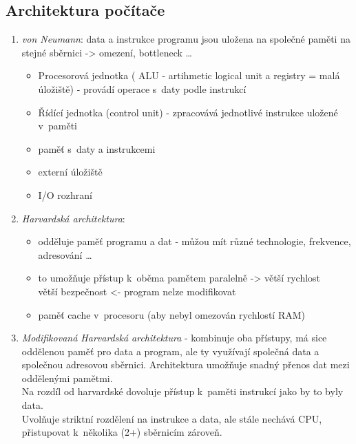 \documentclass[12pt]{article}
\begin{document}
\subsection{Architektura počítače}
\begin{enumerate}
\item \emph{von Neumann}: data a instrukce programu jsou uložena na společné paměti na stejné sběrnici -> omezení, bottleneck \dots
\begin{itemize}
\item Procesorová jednotka ( ALU - artihmetic logical unit a registry = malá úložiště) - provádí operace s~daty podle instrukcí
\item Řídící jednotka (control unit) - zpracovává jednotlivé instrukce uložené v~paměti
\item paměť s~daty a instrukcemi
\item externí úložiště
\item I/O rozhraní
\end{itemize} 
\item \emph{Harvardská architektura}:
\begin{itemize}
\item odděluje paměť programu a dat - můžou mít různé technologie, frekvence, adresování \dots
\item to umožňuje přístup k~oběma pamětem paralelně -> větší rychlost\\ větší bezpečnost <- program nelze modifikovat
\item paměť cache v~procesoru (aby nebyl omezován rychlostí RAM)
\end{itemize}
\item \emph{Modifikovaná Harvardská architektura} - kombinuje oba přístupy, má sice oddělenou paměť pro data a program, ale ty využívají společná data a společnou adresovou sběrnici. Architektura umožňuje snadný přenos dat mezi oddělenými pamětmi.\\
Na rozdíl od harvardské dovoluje přístup k~paměti instrukcí jako by to byly data.\\
Uvolňuje striktní rozdělení na instrukce a data, ale stále nechává CPU, přistupovat k~několika (2+) sběrnicím zároveň.
\end{enumerate}
\end{document}
